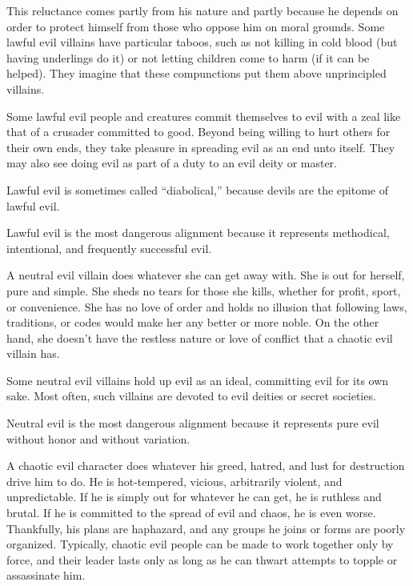         This reluctance comes partly from his nature and partly because he depends on order to protect himself from those who oppose him on moral grounds. Some lawful evil villains have particular taboos, such as not killing in cold blood (but having underlings do it) or not letting children come to harm (if it can be helped). They imagine that these compunctions put them above unprincipled villains.

        Some lawful evil people and creatures commit themselves to evil with a zeal like that of a crusader committed to good. Beyond being willing to hurt others for their own ends, they take pleasure in spreading evil as an end unto itself. They may also see doing evil as part of a duty to an evil deity or master.

        Lawful evil is sometimes called ``diabolical,'' because devils are the epitome of lawful evil.

        Lawful evil is the most dangerous alignment because it represents methodical, intentional, and frequently successful evil.

         A neutral evil villain does whatever she can get away with. She is out for herself, pure and simple. She sheds no tears for those she kills, whether for profit, sport, or convenience. She has no love of order and holds no illusion that following laws, traditions, or codes would make her any better or more noble. On the other hand, she doesn't have the restless nature or love of conflict that a chaotic evil villain has.

        Some neutral evil villains hold up evil as an ideal, committing evil for its own sake. Most often, such villains are devoted to evil deities or secret societies.

        Neutral evil is the most dangerous alignment because it represents pure evil without honor and without variation.

         A chaotic evil character does whatever his greed, hatred, and lust for destruction drive him to do. He is hot-tempered, vicious, arbitrarily violent, and unpredictable. If he is simply out for whatever he can get, he is ruthless and brutal. If he is committed to the spread of evil and chaos, he is even worse. Thankfully, his plans are haphazard, and any groups he joins or forms are poorly organized. Typically, chaotic evil people can be made to work together only by force, and their leader lasts only as long as he can thwart attempts to topple or assassinate him.

